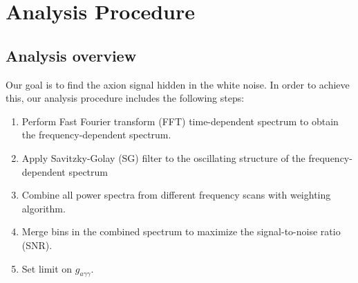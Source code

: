 \section{Analysis Procedure} \label{sec:ana}
    \subsection{Analysis overview}
Our goal is to find the axion signal hidden in the white noise. In order to achieve this, our analysis procedure includes the following steps:
    \begin{enumerate}
        \item Perform Fast Fourier transform (FFT) time-dependent spectrum to obtain the frequency-dependent spectrum.
        \item Apply Savitzky-Golay (SG) filter to the oscillating structure of the frequency-dependent spectrum
        \item Combine all power spectra from different frequency scans with weighting algorithm.
        \item Merge bins in the combined spectrum to maximize the signal-to-noise ratio (SNR).
        \item Set limit on ${g_{a\gamma \gamma}}$.
    \end{enumerate}


